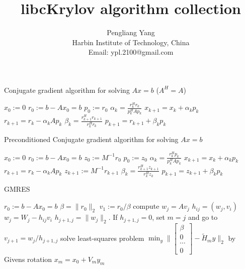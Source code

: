 \documentclass[10pt]{article}
\title{libcKrylov algorithm collection}
\author{Pengliang Yang\\
  Harbin Institute of Technology, China\\
Email: ypl.2100@gmail.com}
\begin{document}
\maketitle


\begin{algorithm}[H]
  \caption{Conjugate gradient algorithm for solving $Ax=b$ ($A^H=A$) \citep{Shewchuk_1994_ICG}}\label{alg:CG}
  \begin{algorithmic}[1]
  \State $x_0:=0$
  \State $r_0:=b-A x_0=b$
  \State $p_0:=r_0$
    \State $\alpha_k=\frac{r_k^H r_k}{p_k^H Ap_k}$
    \State $x_{k+1}=x_k + \alpha_k p_k$
    \State $r_{k+1}=r_k - \alpha_k A p_k$
    \State $\beta_{k} = \frac{r_{k+1}^H r_{k+1}}{r_k^H r_k}$\;
    \State $p_{k+1}=r_{k+1} + \beta_k p_k$\;
    \EndFor
  \end{algorithmic}
\end{algorithm}

\begin{algorithm}[H]
  \caption{Preconditioned Conjugate gradient algorithm for solving $Ax=b$ \citep[algorithm 9.1]{Saad_2003_IMS}}
  \begin{algorithmic}[1]
  \State $x_0:=0$
  \State $r_0:=b-A x_0=b$
  \State $z_0:=M^{-1}r_0$
  \State $p_0:=z_0$
    \State $\alpha_k=\frac{r_k^H p_k}{p_k^H Ap_k}$
    \State $x_{k+1}=x_k + \alpha_k p_k$
    \State $r_{k+1}=r_k - \alpha_k A p_k$
    \State $z_{k+1}:=M^{-1}r_{k+1}$
    \State $\beta_{k} = \frac{r_{k+1}^H z_{k+1}}{r_k^H z_k}$\;
    \State $p_{k+1}=z_{k+1} + \beta_k p_k$\;
    \EndFor
  \end{algorithmic}
\end{algorithm}


\begin{algorithm}[H]
  \caption{GMRES \citep[algorithm 6.9]{Saad_2003_IMS}}
  \begin{algorithmic}[1]
    \State $r_0:=b-A x_0=b$
    \State $\beta=\|r_0\|_2$
    \State $v_1:=r_0/\beta$
    \State compute $w_j=Av_j$
        \State $h_{ij}=(w_j,v_i)$
        \State $w_j=W_j-h_{ij} v_i$
        \EndFor
    \State $h_{j+1,j}=\|w_j\|_2$. If $h_{j+1,j}=0$, set $m=j$ and go to
    \State $v_{j+1} = w_j/h_{j+1,j}$
    \State solve least-squares problem $\min_y\|\begin{bmatrix}
    \beta\\
    0\\
    \cdots\\
    0
    \end{bmatrix}- \tilde{H}_m y\|_2$ by Givens rotation
    \State $x_m = x_0+V_m y_m$
    \EndFor
  \end{algorithmic}
\end{algorithm}
\end{document}
